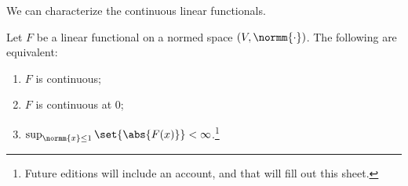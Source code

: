 

We can characterize the continuous linear functionals.


\begin{proposition}
Let $F$ be a linear functional on a normed space $(V, \normm{\cdot})$. The following are equivalent:
\begin{enumerate}
	\item $F$ is continuous;
	\item $F$ is continuous at 0;
  \item $\sup_{\normm{x} \leq 1}\set{\abs{F(x)}} < \infty$.\footnote{Future editions will include an account, and that will fill out this sheet.}
\end{enumerate}
\end{proposition}

\blankpage
